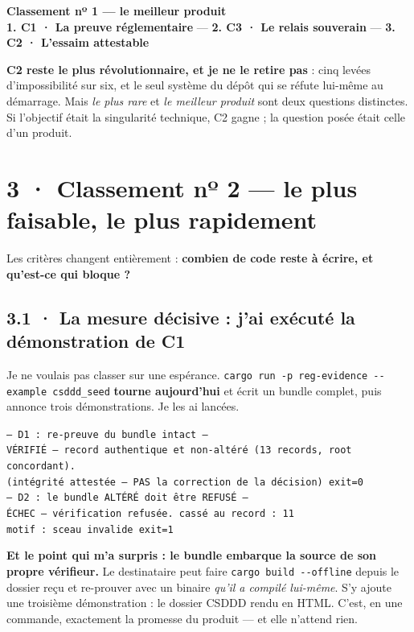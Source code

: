 \documentclass[10pt]{article}
\newcommand{\code}[1]{\texttt{\small #1}}
\begin{document}
\begin{podium}
\textbf{Classement nº 1 --- le meilleur produit} \\[3pt]
\textbf{1. C1 · La preuve réglementaire} \quad --- \quad
\textbf{2. C3 · Le relais souverain} \quad --- \quad
\textbf{3. C2 · L'essaim attestable}
\end{podium}

\textbf{C2 reste le plus révolutionnaire, et je ne le retire pas} : cinq levées d'impossibilité sur
six, et le seul système du dépôt qui se réfute lui-même au démarrage. Mais \emph{le plus rare} et
\emph{le meilleur produit} sont deux questions distinctes. Si l'objectif était la singularité
technique, C2 gagne ; la question posée était celle d'un produit.

\section{3 · Classement nº 2 --- le plus faisable, le plus rapidement}

Les critères changent entièrement : \textbf{combien de code reste à écrire, et qu'est-ce qui bloque ?}

\subsection{3.1 · La mesure décisive : j'ai exécuté la démonstration de C1}

Je ne voulais pas classer sur une espérance. \code{cargo run -p reg-evidence -{}-example csddd\_seed}
\textbf{tourne aujourd'hui} et écrit un bundle complet, puis annonce trois démonstrations. Je les ai
lancées.

\begin{extrait}
\code{-- D1 : re-preuve du bundle intact --} \\
\code{VÉRIFIÉ --- record authentique et non-altéré (13 records, root concordant).} \\
\code{(intégrité attestée --- PAS la correction de la décision) \hfill exit=0} \\[4pt]
\code{-- D2 : le bundle ALTÉRÉ doit être REFUSÉ --} \\
\code{ÉCHEC --- vérification refusée. cassé au record : 11} \\
\code{motif : sceau invalide \hfill exit=1}
\end{extrait}

\begin{acquis}
\textbf{Et le point qui m'a surpris : le bundle embarque la source de son propre vérifieur.} Le
destinataire peut faire \code{cargo build -{}-offline} depuis le dossier reçu et re-prouver avec un
binaire \emph{qu'il a compilé lui-même}. S'y ajoute une troisième démonstration : le dossier CSDDD
rendu en HTML. C'est, en une commande, exactement la promesse du produit --- et elle n'attend rien.
\end{acquis}
\end{document}
